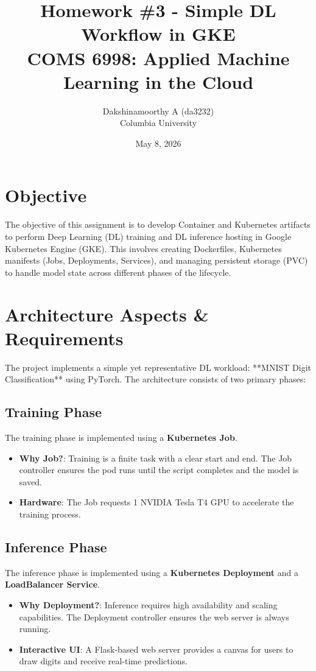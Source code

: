 \documentclass[11pt]{article}
\title{Homework \#3 - Simple DL Workflow in GKE \\ \large COMS 6998: Applied Machine Learning in the Cloud}
\author{Dakshinamoorthy A (da3232) \\ Columbia University}
\date{May 8, 2026}
\begin{document}
\maketitle

\section{Objective}
The objective of this assignment is to develop Container and Kubernetes artifacts to perform Deep Learning (DL) training and DL inference hosting in Google Kubernetes Engine (GKE). This involves creating Dockerfiles, Kubernetes manifests (Jobs, Deployments, Services), and managing persistent storage (PVC) to handle model state across different phases of the lifecycle.

\section{Architecture Aspects \& Requirements}
The project implements a simple yet representative DL workload: **MNIST Digit Classification** using PyTorch. The architecture consists of two primary phases:

\subsection{Training Phase}
The training phase is implemented using a \textbf{Kubernetes Job}. 
\begin{itemize}
    \item \textbf{Why Job?}: Training is a finite task with a clear start and end. The Job controller ensures the pod runs until the script completes and the model is saved.
    \item \textbf{Hardware}: The Job requests 1 NVIDIA Tesla T4 GPU to accelerate the training process.
\end{itemize}

\subsection{Inference Phase}
The inference phase is implemented using a \textbf{Kubernetes Deployment} and a \textbf{LoadBalancer Service}.
\begin{itemize}
    \item \textbf{Why Deployment?}: Inference requires high availability and scaling capabilities. The Deployment controller ensures the web server is always running.
    \item \textbf{Interactive UI}: A Flask-based web server provides a canvas for users to draw digits and receive real-time predictions.
\end{itemize}
\end{document}
